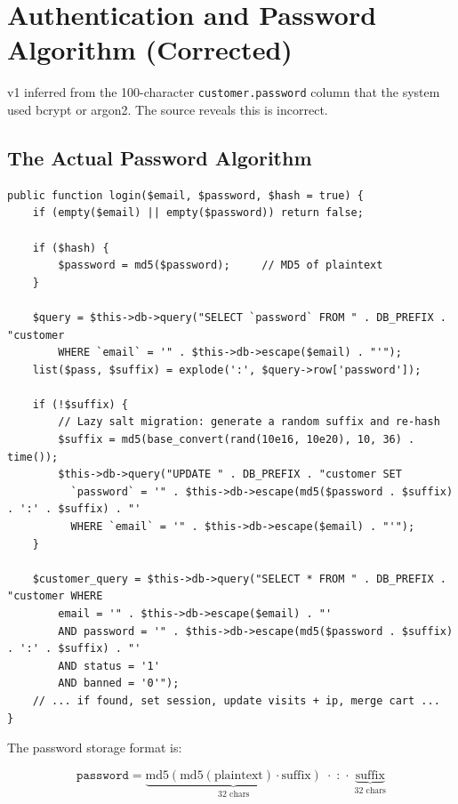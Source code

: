 \documentclass[11pt,a4paper]{article}
\begin{document}
\section{Authentication and Password Algorithm (Corrected)}\label{sec:auth}

v1 inferred from the 100-character \texttt{customer.password} column
that the system used bcrypt or argon2. The source reveals this is
incorrect.

\subsection{The Actual Password Algorithm}

\begin{lstlisting}[caption={\texttt{system/library/customer.php} --- the actual login method (abridged).},label={lst:customer-login}]
public function login($email, $password, $hash = true) {
    if (empty($email) || empty($password)) return false;

    if ($hash) {
        $password = md5($password);     // MD5 of plaintext
    }

    $query = $this->db->query("SELECT `password` FROM " . DB_PREFIX . "customer
        WHERE `email` = '" . $this->db->escape($email) . "'");
    list($pass, $suffix) = explode(':', $query->row['password']);

    if (!$suffix) {
        // Lazy salt migration: generate a random suffix and re-hash
        $suffix = md5(base_convert(rand(10e16, 10e20), 10, 36) . time());
        $this->db->query("UPDATE " . DB_PREFIX . "customer SET
          `password` = '" . $this->db->escape(md5($password . $suffix) . ':' . $suffix) . "'
          WHERE `email` = '" . $this->db->escape($email) . "'");
    }

    $customer_query = $this->db->query("SELECT * FROM " . DB_PREFIX . "customer WHERE
        email = '" . $this->db->escape($email) . "'
        AND password = '" . $this->db->escape(md5($password . $suffix) . ':' . $suffix) . "'
        AND status = '1'
        AND banned = '0'");
    // ... if found, set session, update visits + ip, merge cart ...
}
\end{lstlisting}

The password storage format is:

\begin{equation*}
\texttt{password} = \underbrace{\text{md5}(\text{md5}(\text{plaintext}) \cdot \text{suffix})}_{32\text{ chars}} \;\cdot\;\texttt{:}\;\cdot\; \underbrace{\text{suffix}}_{32\text{ chars}}
\end{equation*}
\end{document}
